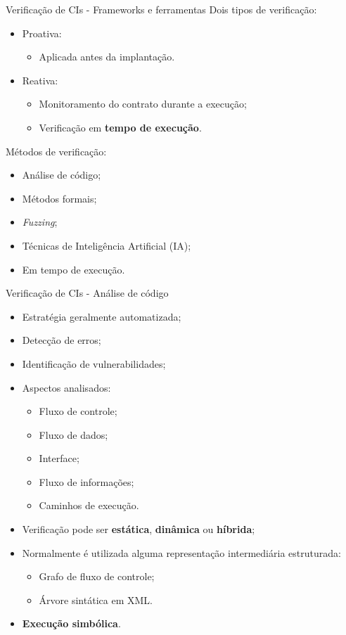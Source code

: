 \begin{frame}{Verificação de CIs - Frameworks e ferramentas}
    Dois tipos de verificação:
    \begin{itemize}
        \item Proativa:
        \begin{itemize}
            \item Aplicada antes da implantação.
        \end{itemize}
        \item Reativa:
        \begin{itemize}
            \item Monitoramento do contrato durante a execução;
            \item Verificação em \textbf{tempo de execução}.
        \end{itemize}
    \end{itemize}
    Métodos de verificação:
    \begin{itemize}
        \item Análise de código;
        \item Métodos formais;
        \item \textit{Fuzzing};
        \item Técnicas de Inteligência Artificial (IA);
        \item Em tempo de execução.
    \end{itemize}
\end{frame}

\begin{frame}{Verificação de CIs - Análise de código}
    \begin{itemize}
        \item Estratégia geralmente automatizada;
        \item Detecção de erros;
        \item Identificação de vulnerabilidades;
        \item Aspectos analisados:
        \begin{itemize}
            \item Fluxo de controle;
            \item Fluxo de dados;
            \item Interface;
            \item Fluxo de informações;
            \item Caminhos de execução.
        \end{itemize}
        \item Verificação pode ser \textbf{estática}, \textbf{dinâmica} ou \textbf{híbrida};
        \item Normalmente é utilizada alguma representação intermediária estruturada:
        \begin{itemize}
            \item Grafo de fluxo de controle;
            \item Árvore sintática em XML.
        \end{itemize}
        \item \textbf{Execução simbólica}.
    \end{itemize}
\end{frame}

